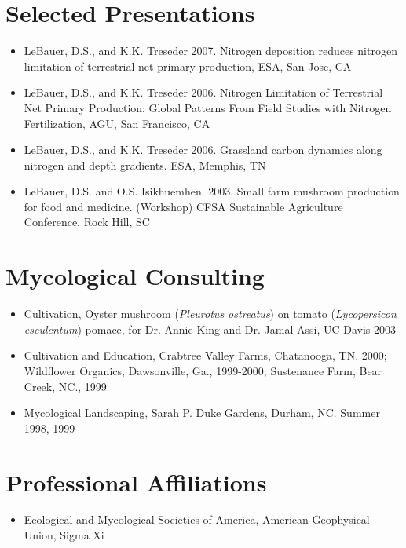 \documentclass[overlapped,line,letterpaper,10pt]{res}
\begin{document}
\begin{resume}
\section{Selected Presentations}\vspace{0.5cm} 
\begin{itemize}
\item LeBauer, D.S., and K.K. Treseder 2007. Nitrogen deposition reduces nitrogen limitation of terrestrial net primary production, ESA, San Jose, CA
\item LeBauer, D.S., and K.K. Treseder 2006. Nitrogen Limitation of Terrestrial Net Primary Production: Global Patterns From Field Studies with Nitrogen Fertilization, AGU, San Francisco, CA
\item LeBauer, D.S., and K.K. Treseder 2006. Grassland carbon dynamics along nitrogen and depth gradients. ESA, Memphis, TN
\item LeBauer, D.S. and O.S. Isikhuemhen. 2003. Small farm mushroom production for food and medicine. (Workshop) CFSA Sustainable Agriculture Conference, Rock Hill, SC
\end{itemize}
\section{Mycological Consulting}\vspace{0.5cm}
\begin{itemize}
\item{Cultivation,} Oyster mushroom (\textit{Pleurotus ostreatus}) on tomato (\textit{Lycopersicon esculentum}) pomace, for Dr. Annie King and Dr. Jamal Assi, UC Davis 2003
\item{Cultivation and Education,} Crabtree Valley Farms, Chatanooga, TN. 2000; Wildflower Organics, Dawsonville, Ga., 1999-2000; Sustenance Farm, Bear Creek, NC., 1999
\item{Mycological Landscaping,} Sarah P. Duke Gardens, Durham, NC. Summer 1998, 1999
\end{itemize}
\vspace{-0.25cm}
\section{Professional Affiliations}\vspace{0.5cm}
\begin{itemize}
\item{Ecological and Mycological Societies of America, American Geophysical Union, Sigma Xi}
\end{itemize}


\end{resume}
\end{document}
